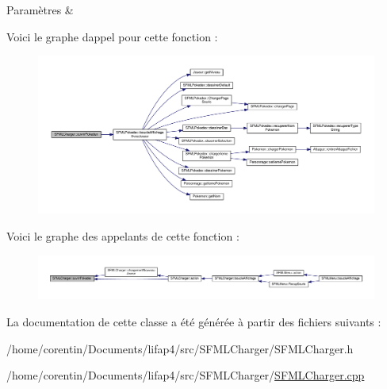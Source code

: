 \begin{DoxyParams}{Paramètres}
{\em } & \\
\hline
\end{DoxyParams}
Voici le graphe d\textquotesingle{}appel pour cette fonction \+:\nopagebreak
\begin{figure}[H]
\begin{center}
\leavevmode
\includegraphics[width=350pt]{class_s_f_m_l_charger_a67c610529df46560908104f963d741f1_cgraph}
\end{center}
\end{figure}
Voici le graphe des appelants de cette fonction \+:\nopagebreak
\begin{figure}[H]
\begin{center}
\leavevmode
\includegraphics[width=350pt]{class_s_f_m_l_charger_a67c610529df46560908104f963d741f1_icgraph}
\end{center}
\end{figure}


La documentation de cette classe a été générée à partir des fichiers suivants \+:\begin{DoxyCompactItemize}
\item 
/home/corentin/\+Documents/lifap4/src/\+S\+F\+M\+L\+Charger/S\+F\+M\+L\+Charger.\+h\item 
/home/corentin/\+Documents/lifap4/src/\+S\+F\+M\+L\+Charger/\hyperlink{_s_f_m_l_charger_8cpp}{S\+F\+M\+L\+Charger.\+cpp}\end{DoxyCompactItemize}
